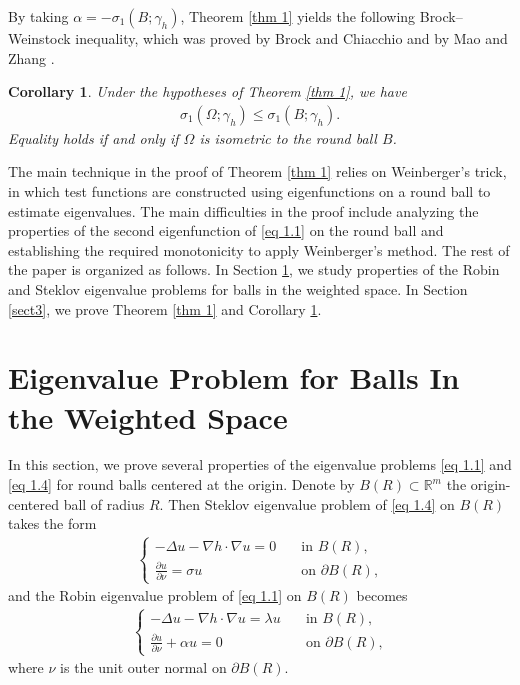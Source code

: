 \documentclass[11pt,leqno]{amsart}
\newtheorem{corollary}[theorem]{Corollary}
\def\a{\alpha}
\def\l{\lambda}
\def\p{\partial}
\def\R{\mathbb{R}}
\def \p {\partial}
\numberwithin{equation}{section}
\begin{document}
By taking $\a=-\sigma_1(B;\gamma_h)$, Theorem \ref{thm 1} yields the following Brock–Weinstock inequality, which was proved by Brock and Chiacchio \cite[Theorems 1.4 and 1.5]{BC25} and by Mao and Zhang \cite[Corollary 1.2]{MZ24}. 
\begin{corollary}\label{cor}
Under the hypotheses of Theorem \ref{thm 1}, we have 
\begin{align*}
\sigma_1(\Omega; \gamma_h)\le \sigma_1(B; \gamma_h).
\end{align*}
Equality holds if and only if $\Omega$ is isometric to the round ball $B$.
\end{corollary}


The main technique in the proof of Theorem \ref{thm 1} relies on Weinberger’s trick, in which  test functions are constructed using eigenfunctions on a round ball to estimate eigenvalues. The main difficulties in the proof include analyzing the properties of the second eigenfunction of \eqref{eq 1.1} on the round ball  and establishing the required monotonicity to apply Weinberger’s method. The rest of the paper is organized as follows.
In Section \ref{sect2}, we study properties of the Robin and Steklov eigenvalue  problems for balls in the weighted space. In Section  \ref{sect3}, we prove Theorem \ref{thm 1} and Corollary \ref{cor}.

\section{Eigenvalue Problem for Balls In the Weighted Space}\label{sect2}
In this section, we  prove several properties of the eigenvalue problems \eqref{eq 1.1} and  \eqref{eq 1.4}  for round balls centered at the origin. Denote by $B(R)\subset\R^m$ the origin-centered  ball of radius $R$. Then Steklov eigenvalue problem of \eqref{eq 1.4} on $B(R)$ takes the form 
\begin{align}\label{eq 2.1}
\begin{cases}
      -\Delta u-\nabla h\cdot \nabla u=0 \quad & \text{in $B(R)$,}\\
\frac{\p u}{\p \nu}=\sigma u \quad & \text{on $\p B(R)$,}
\end{cases}
\end{align}
and the Robin eigenvalue problem  of \eqref{eq 1.1} on $B(R)$ becomes  
\begin{align}\label{eq 2.2}
\begin{cases}
    -\Delta u-\nabla h \cdot \nabla u=\l u \quad & \text{in $B(R)$,}\\
\frac{\p u}{\p \nu}+\a u=0 \quad & \text{on $\p B(R)$,}
\end{cases}
\end{align}
where $\nu$ is the unit outer normal  on $\p B(R)$.
\end{document}
